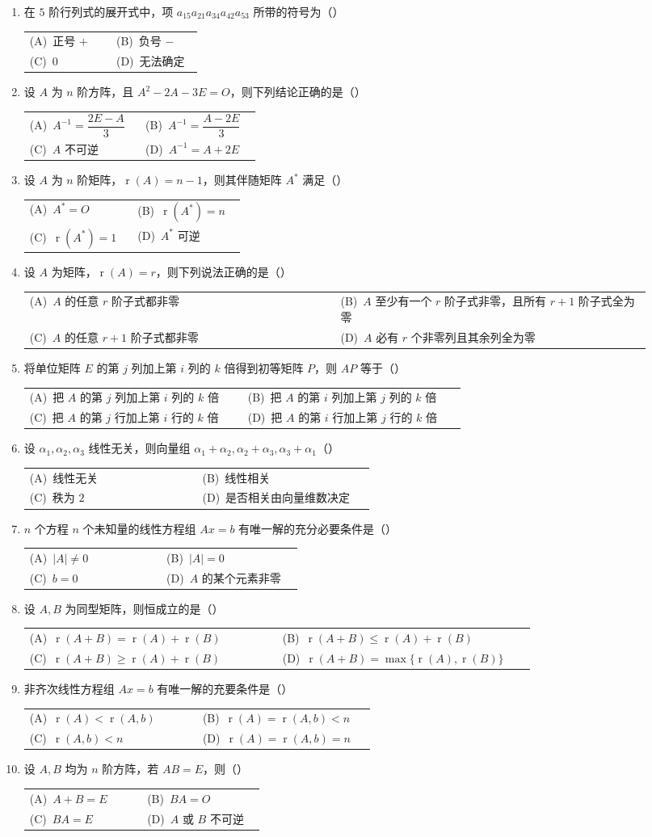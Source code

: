 \documentclass[12pt]{ctexart}
\makeatletter
\newcommand{\rnk}{\operatorname{r}}
\newcommand{\optgrid}[4]{%
  \par\smallskip\noindent
  \begin{tabular}{@{}p{0.46\linewidth}p{0.46\linewidth}@{}}
  (A)~#1 & (B)~#2 \\[3pt]
  (C)~#3 & (D)~#4
  \end{tabular}}
\makeatother
\begin{document}
\begin{enumerate}[label=\arabic*.]
\item 在 $5$ 阶行列式的展开式中，项 $a_{15}a_{21}a_{34}a_{42}a_{53}$ 所带的符号为（\qquad）
  \optgrid{正号 $+$}{负号 $-$}{$0$}{无法确定}

\item 设 $A$ 为 $n$ 阶方阵，且 $A^{2}-2A-3E=O$，则下列结论正确的是（\qquad）
  \optgrid{$A^{-1}=\dfrac{2E-A}{3}$}{$A^{-1}=\dfrac{A-2E}{3}$}{$A$ 不可逆}{$A^{-1}=A+2E$}

\item 设 $A$ 为 $n$ 阶矩阵，$\rnk(A)=n-1$，则其伴随矩阵 $A^{*}$ 满足（\qquad）
  \optgrid{$A^{*}=O$}{$\rnk(A^{*})=n$}{$\rnk(A^{*})=1$}{$A^{*}$ 可逆}

\item 设 $A$ 为矩阵，$\rnk(A)=r$，则下列说法正确的是（\qquad）
  \optgrid{$A$ 的任意 $r$ 阶子式都非零}{$A$ 至少有一个 $r$ 阶子式非零，且所有 $r+1$ 阶子式全为零}{$A$ 的任意 $r+1$ 阶子式都非零}{$A$ 必有 $r$ 个非零列且其余列全为零}

\item 将单位矩阵 $E$ 的第 $j$ 列加上第 $i$ 列的 $k$ 倍得到初等矩阵 $P$，则 $AP$ 等于（\qquad）
  \optgrid{把 $A$ 的第 $j$ 列加上第 $i$ 列的 $k$ 倍}{把 $A$ 的第 $i$ 列加上第 $j$ 列的 $k$ 倍}{把 $A$ 的第 $j$ 行加上第 $i$ 行的 $k$ 倍}{把 $A$ 的第 $i$ 行加上第 $j$ 行的 $k$ 倍}

\item 设 $\alpha_1,\alpha_2,\alpha_3$ 线性无关，则向量组
  $\alpha_1+\alpha_2,\alpha_2+\alpha_3,\alpha_3+\alpha_1$（\qquad）
  \optgrid{线性无关}{线性相关}{秩为 $2$}{是否相关由向量维数决定}

\item $n$ 个方程 $n$ 个未知量的线性方程组 $Ax=b$ 有唯一解的充分必要条件是（\qquad）
  \optgrid{$|A|\neq0$}{$|A|=0$}{$b=0$}{$A$ 的某个元素非零}

\item 设 $A,B$ 为同型矩阵，则恒成立的是（\qquad）
  \optgrid{$\rnk(A+B)=\rnk(A)+\rnk(B)$}{$\rnk(A+B)\leq \rnk(A)+\rnk(B)$}{$\rnk(A+B)\geq \rnk(A)+\rnk(B)$}{$\rnk(A+B)=\max\{\rnk(A),\rnk(B)\}$}

\item 非齐次线性方程组 $Ax=b$ 有唯一解的充要条件是（\qquad）
  \optgrid{$\rnk(A)<\rnk(A,b)$}{$\rnk(A)=\rnk(A,b)<n$}{$\rnk(A,b)<n$}{$\rnk(A)=\rnk(A,b)=n$}

\item 设 $A,B$ 均为 $n$ 阶方阵，若 $AB=E$，则（\qquad）
  \optgrid{$A+B=E$}{$BA=O$}{$BA=E$}{$A$ 或 $B$ 不可逆}
\end{enumerate}
\end{document}
